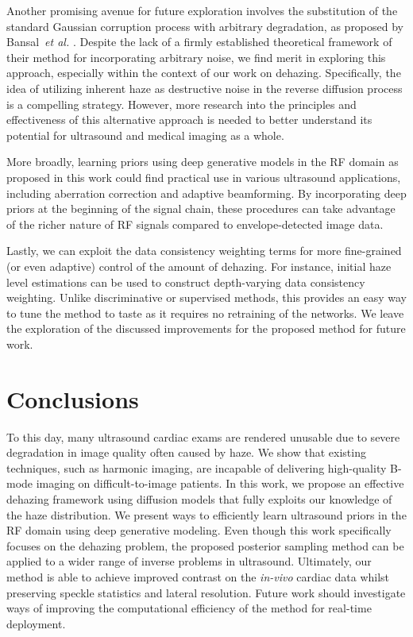 \documentclass[journal,twoside,web]{ieeecolor}
\begin{document}
Another promising avenue for future exploration involves the substitution of the standard Gaussian corruption process with arbitrary degradation, as proposed by Bansal~\emph{et al.} \cite{bansal2022cold}. Despite the lack of a firmly established theoretical framework of their method for incorporating arbitrary noise, we find merit in exploring this approach, especially within the context of our work on dehazing. Specifically, the idea of utilizing inherent haze as destructive noise in the reverse diffusion process is a compelling strategy. However, more research into the principles and effectiveness of this alternative approach is needed to better understand its potential for ultrasound and medical imaging as a whole.

More broadly, learning priors using deep generative models in the RF domain as proposed in this work could find practical use in various ultrasound applications, including aberration correction and adaptive beamforming. By incorporating deep priors at the beginning of the signal chain, these procedures can take advantage of the richer nature of RF signals compared to envelope-detected image data.

Lastly, we can exploit the data consistency weighting terms for more fine-grained (or even adaptive) control of the amount of dehazing. For instance, initial haze level estimations can be used to construct depth-varying data consistency weighting. Unlike discriminative or supervised methods, this provides an easy way to tune the method to taste as it requires no retraining of the networks. We leave the exploration of the discussed improvements for the proposed method for future work.

\section{Conclusions}
\label{sec:conclusions} 
To this day, many ultrasound cardiac exams are rendered unusable due to severe degradation in image quality often caused by haze. We show that existing techniques, such as harmonic imaging, are incapable of delivering high-quality B-mode imaging on difficult-to-image patients. In this work, we propose an effective dehazing framework using diffusion models that fully exploits our knowledge of the haze distribution. We present ways to efficiently learn ultrasound priors in the RF domain using deep generative modeling. Even though this work specifically focuses on the dehazing problem, the proposed posterior sampling method can be applied to a wider range of inverse problems in ultrasound. Ultimately, our method is able to achieve improved contrast on the \emph{in-vivo} cardiac data whilst preserving speckle statistics and lateral resolution. Future work should investigate ways of improving the computational efficiency of the method for real-time deployment.


\end{document}
